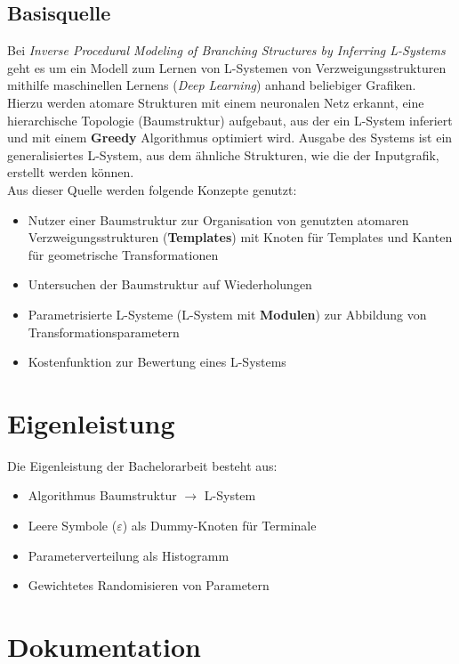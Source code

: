 \documentclass[11pt]{article}
\begin{document}
    \subsection{Basisquelle}
    Bei \textit{Inverse Procedural Modeling of Branching Structures by Inferring L-Systems}\cite{2} geht es um ein
    Modell zum Lernen von L-Systemen von Verzweigungsstrukturen mithilfe maschinellen Lernens (\textit{Deep
    Learning}) anhand beliebiger Grafiken.
    Hierzu werden atomare Strukturen mit einem neuronalen Netz erkannt, eine hierarchische Topologie (Baumstruktur)
    aufgebaut, aus der ein L-System inferiert und mit einem \textbf{Greedy} Algorithmus optimiert wird.
    Ausgabe des Systems ist ein generalisiertes L-System, aus dem ähnliche Strukturen, wie die der Inputgrafik,
    erstellt werden können.\\
    Aus dieser Quelle werden folgende Konzepte genutzt:
    \begin{itemize}
        \item Nutzer einer Baumstruktur zur Organisation von genutzten atomaren Verzweigungsstrukturen
        (\textbf{Templates}) mit Knoten für Templates und Kanten für geometrische Transformationen
        \item Untersuchen der Baumstruktur auf Wiederholungen
        \item Parametrisierte L-Systeme (L-System mit \textbf{Modulen}) zur Abbildung von Transformationsparametern
        \item Kostenfunktion zur Bewertung eines L-Systems
    \end{itemize}


    \section{Eigenleistung}
    Die Eigenleistung der Bachelorarbeit besteht aus:
    \begin{itemize}
        \item Algorithmus Baumstruktur $\rightarrow$ L-System
        \item Leere Symbole ($\varepsilon$) als Dummy-Knoten für Terminale
        \item Parameterverteilung als Histogramm
        \item Gewichtetes Randomisieren von Parametern
    \end{itemize}

    \newpage

    \section{Dokumentation}
\end{document}
